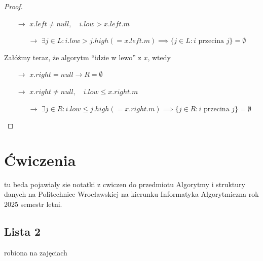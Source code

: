 \documentclass[11pt,a4paper]{article}
\begin{document}
\begin{enumerate}
\begin{itemize}
\begin{proof}
\begin{itemize}
                        \item[$\rightarrow$] $x.left \neq null, \quad i.low > x.left.m$
                            \begin{itemize}
                                \item[$\rightarrow$] $\exists j \in L: i.low > j.high (= x.left.m) \implies \{j \in L: i \text{ przecina } j\}=\emptyset$
                            \end{itemize}
                    \end{itemize}
                    Załóżmy teraz, że algorytm ``idzie w lewo'' z $x$, wtedy
                    \begin{itemize}
                        \item[$\rightarrow$] $x.right=null \rightarrow R=\emptyset$
                        \item[$\rightarrow$] $x.right \neq null, \quad i.low \leq x.right.m$
                            \begin{itemize}
                                \item[$\rightarrow$] $\exists j \in R: i.low \leq j.high (= x.right.m) \implies \{j \in R: i \text{ przecina } j\}=\emptyset$
                            \end{itemize}
                    \end{itemize}
                \end{proof}
        \end{itemize}
\end{enumerate}

\pagebreak
\section{Ćwiczenia}
tu beda pojawialy sie notatki z cwiczen do przedmiotu Algorytmy i struktury danych na Politechnice Wrocławskiej na kierunku Informatyka Algorytmiczna rok 2025 semestr letni.

\subsection{Lista 2}
robiona na zajęciach \date{2025-03-10}
\end{document}
